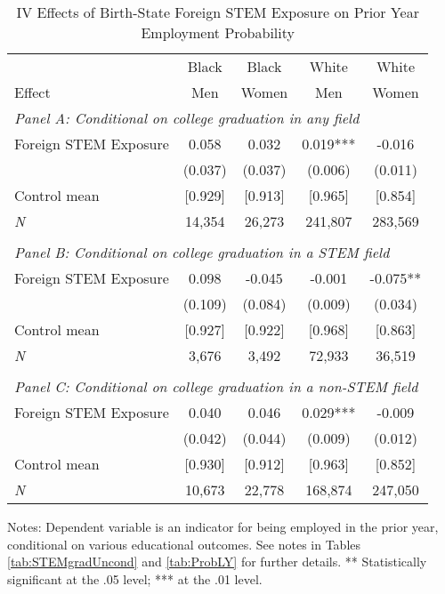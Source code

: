 \begin{table}[ht]
\caption{IV Effects of Birth-State Foreign STEM Exposure on Prior Year Employment Probability}
\label{tab:ivProbLY}
\centering
\begin{threeparttable}
\begin{tabular}{lcccc}
\toprule 
       & Black           & Black        & White        & White       \\
Effect & Men             & Women        & Men          & Women       \\
\midrule 
\multicolumn{5}{l}{\emph{Panel A: Conditional on college graduation in any field}}\\ 
Foreign STEM Exposure & 0.058  & 0.032  & 0.019*** & -0.016  \\ 
 &  (0.037) & (0.037) & (0.006) & (0.011) \\ 
Control mean &  [0.929] & [0.913] & [0.965] & [0.854] \\ 
\emph{N} &     14,354 &    26,273 &   241,807 &   283,569 \\ 
&&&&\\
\multicolumn{5}{l}{\emph{Panel B: Conditional on college graduation in a STEM field}}\\ 
Foreign STEM Exposure & 0.098  & -0.045  & -0.001  & -0.075** \\ 
 &  (0.109) & (0.084) & (0.009) & (0.034) \\ 
Control mean &  [0.927] & [0.922] & [0.968] & [0.863] \\ 
\emph{N} &      3,676 &     3,492 &    72,933 &    36,519 \\ 
&&&&\\
\multicolumn{5}{l}{\emph{Panel C: Conditional on college graduation in a non-STEM field}}\\ 
Foreign STEM Exposure & 0.040  & 0.046  & 0.029*** & -0.009  \\ 
 &  (0.042) & (0.044) & (0.009) & (0.012) \\ 
Control mean &  [0.930] & [0.912] & [0.963] & [0.852] \\ 
\emph{N} &     10,673 &    22,778 &   168,874 &   247,050 \\ 
\bottomrule 
\end{tabular} 
\footnotesize Notes: Dependent variable is an indicator for being employed in the prior year, conditional on various educational outcomes.  See notes in Tables \ref{tab:STEMgradUncond} and \ref{tab:ProbLY} for further details. ** Statistically significant at the .05 level; *** at the .01 level.
\end{threeparttable} 
\end{table} 
